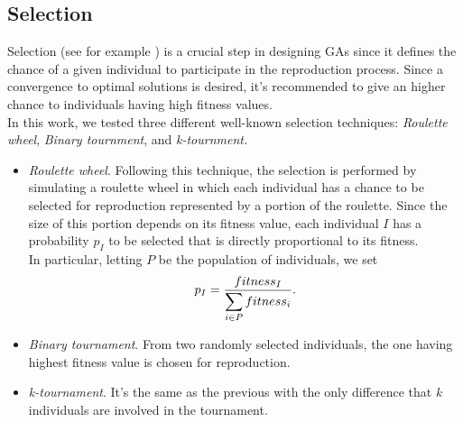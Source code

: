 \documentclass[opre,nonblindrev]{informs3} %
\begin{document}
\subsection{Selection}
Selection (see for example \cite{sel1}) is a crucial step in designing GAs since it defines the chance of a given individual to participate in the reproduction process. Since a convergence to optimal solutions is desired, it's recommended to give an higher chance to individuals having high fitness values.\\
In this work, we tested three different well-known selection techniques: \textit{Roulette wheel}, \textit{Binary tournment}, and \textit{k-tournment.}
\begin{itemize}
	\item \textit{Roulette wheel}. Following this technique, the selection is performed by simulating a roulette wheel in which each individual has a chance to be selected for reproduction represented by a portion of the roulette. Since the size of this portion depends on its fitness value, each individual $I$ has a probability $p_I$ to be selected that is directly proportional to its fitness.\\In particular, letting $P$ be the population of individuals, we set $$p_I = \frac{fitness_I}{\displaystyle\sum_{i \in P}fitness_i}.$$
	\item \textit{Binary tournament}. From two randomly selected individuals, the one having highest fitness value is chosen for reproduction.
	\item \textit{k-tournament}. It's the same as the previous with the only difference that $k$ individuals are involved in the tournament. 
\end{itemize}
\end{document}
